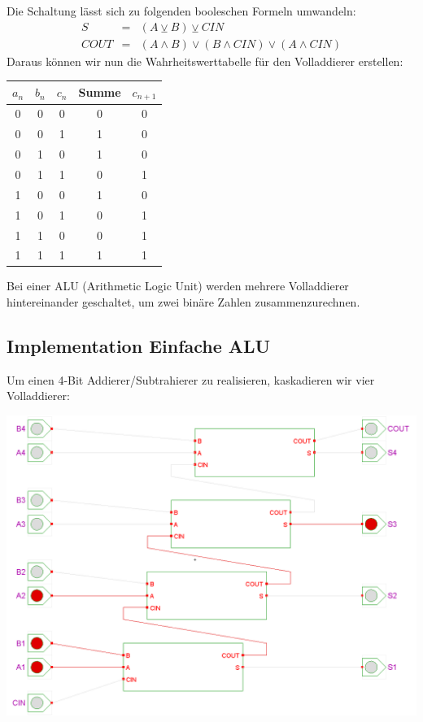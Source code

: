 \documentclass{report}
\begin{document}
Die Schaltung lässt sich zu folgenden booleschen Formeln umwandeln:
\begin{eqnarray}
S & = & (A \veebar B) \veebar CIN \\
COUT & = & (A \land B) \lor (B \land CIN) \lor (A \land CIN)\end{eqnarray}
Daraus können wir nun die Wahrheitswerttabelle für den Volladdierer erstellen:
\begin{center}\begin{tabular}{c c c | c c}
$a_n$ & $b_n$ & $c_n$ & Summe & $c_{n+1}$ \\ \hline
0 & 0 & 0 & 0 & 0\\
0 & 0 & 1 & 1 & 0\\
0 & 1 & 0 & 1 & 0\\
0 & 1 & 1 & 0 & 1\\
1 & 0 & 0 & 1 & 0\\
1 & 0 & 1 & 0 & 1\\
1 & 1 & 0 & 0 & 1\\
1 & 1 & 1 & 1 & 1\\
\end{tabular}\end{center}
Bei einer ALU (Arithmetic Logic Unit) werden mehrere Volladdierer hintereinander geschaltet, um zwei binäre Zahlen zusammenzurechnen.
\newpage\subsection{Implementation Einfache ALU}
Um einen 4-Bit Addierer/Subtrahierer zu realisieren, kaskadieren wir vier Volladdierer:
\begin{center}\includegraphics[scale=0.2]{img/four-full-adders.png}\end{center}
\end{document}
